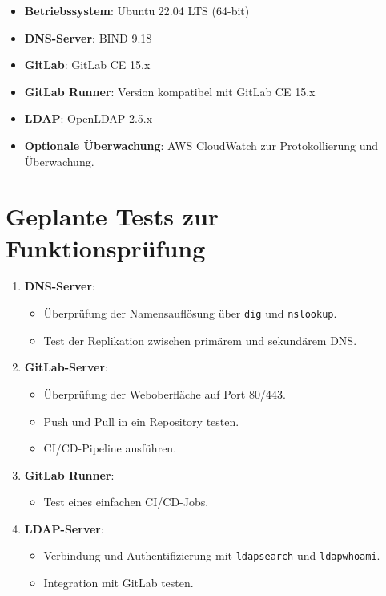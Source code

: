 \documentclass[a4paper,12pt]{article}
\begin{document}
\begin{itemize}
    \item \textbf{Betriebssystem}: Ubuntu 22.04 LTS (64-bit)
    \item \textbf{DNS-Server}: BIND 9.18
    \item \textbf{GitLab}: GitLab CE 15.x
    \item \textbf{GitLab Runner}: Version kompatibel mit GitLab CE 15.x
    \item \textbf{LDAP}: OpenLDAP 2.5.x
    \item \textbf{Optionale Überwachung}: AWS CloudWatch zur Protokollierung und Überwachung.
\end{itemize}

\section{Geplante Tests zur Funktionsprüfung}
\begin{enumerate}
    \item \textbf{DNS-Server}:
    \begin{itemize}
        \item Überprüfung der Namensauflösung über \texttt{dig} und \texttt{nslookup}.
        \item Test der Replikation zwischen primärem und sekundärem DNS.
    \end{itemize}
    \item \textbf{GitLab-Server}:
    \begin{itemize}
        \item Überprüfung der Weboberfläche auf Port 80/443.
        \item Push und Pull in ein Repository testen.
        \item CI/CD-Pipeline ausführen.
    \end{itemize}
    \item \textbf{GitLab Runner}:
    \begin{itemize}
        \item Test eines einfachen CI/CD-Jobs.
    \end{itemize}
    \item \textbf{LDAP-Server}:
    \begin{itemize}
        \item Verbindung und Authentifizierung mit \texttt{ldapsearch} und \texttt{ldapwhoami}.
        \item Integration mit GitLab testen.
    \end{itemize}
\end{enumerate}
\end{document}
